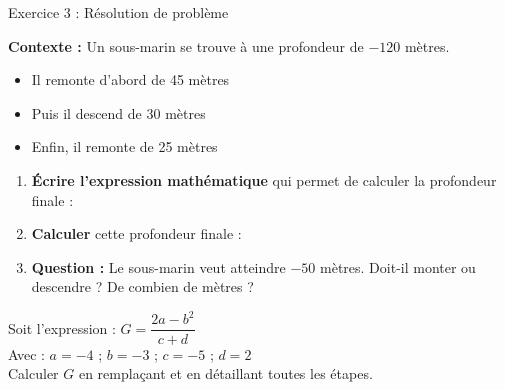\begin{exercisebox}{ Exercice 3 : Résolution de problème }
  \vspace{0.01cm}
  \begin{tcolorbox}[colback=blue!5,colframe=primary!30,arc=2mm,boxrule=0.5pt]
    \textbf{Contexte :} Un sous-marin se trouve à une profondeur de $-120$ mètres.
    \begin{itemize}[noitemsep,topsep=5pt]
      \item Il remonte d'abord de 45 mètres
      \item Puis il descend de 30 mètres
      \item Enfin, il remonte de 25 mètres
    \end{itemize}
  \end{tcolorbox}

  \begin{enumerate}[leftmargin=*]
    \item \textbf{Écrire l'expression mathématique} qui permet de calculer la profondeur finale : \\

    \item \textbf{Calculer} cette profondeur finale : \\

    \item \textbf{Question :} Le sous-marin veut atteindre $-50$ mètres. Doit-il monter ou descendre ? De combien de mètres ? \\
  \end{enumerate}
\end{exercisebox}

\vspace{0.2cm}

\begin{tcolorbox}[
  colback=accent!10,
  colframe=accent,
  fonttitle=\bfseries,
  title={\faIcon{star} BONUS : Défi \badge{accent}{+2pts}},
  arc=3mm,
  boxrule=1.5pt,
  enhanced,
  width=\linewidth,
  grow to left by=3mm,
  grow to right by=3mm
]
  Soit l'expression : $G = \dfrac{2a - b^2}{c + d}$\\
  Avec : $a = -4$ ; $b = -3$ ; $c = -5$ ; $d = 2$\\
  Calculer $G$ en remplaçant et en détaillant toutes les étapes.\\
\end{tcolorbox}

